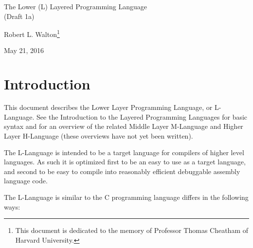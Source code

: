 \documentclass[12pt]{article}
\makeatletter
\renewcommand\tableofcontents{%
    \begin{list}{}%
	     {\setlength{\itemsep}{0in}%
	      \setlength{\topsep}{0in}%
	      \setlength{\parsep}{1ex}%
	      \setlength{\labelwidth}{0in}%
	      \setlength{\baselineskip}{1.5ex}%
	      \setlength{\leftmargin}{1.0in}%
	      \setlength{\rightmargin}{1.0in}}%
    \item\@starttoc{toc}%
    \end{list}}
\makeatother
\begin{document}
        
\begin{center}

{\Large
The Lower (L) Layered Programming Language \\[0.5ex]
(Draft 1a)}

\medskip

Robert L. Walton\footnote{This document is dedicated to the memory
of Professor Thomas Cheatham of Harvard University.}

May 21, 2016
 
\end{center}

{\small \tableofcontents}

\newpage

\section{Introduction}

This document describes the Lower Layer Programming Language, or
L-Language.  See the Introduction to the Layered
Programming Languages for basic syntax and for an overview of the related
Middle Layer M-Language and Higher Layer H-Language (these overviews
have not yet been written).

The L-Language is intended to be a target language for compilers of
higher level languages.  As such it is optimized first to be an easy to 
use as a target language, and second to be easy to
compile into reasonably efficient debuggable assembly language code.

The L-Language is similar to the C programming language
differs in the following ways:
\end{document}
